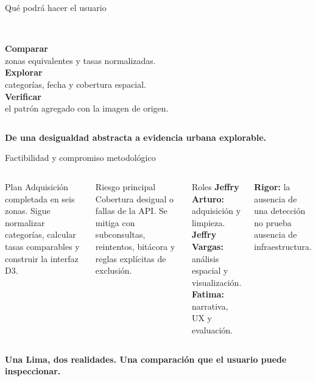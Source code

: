 \documentclass[aspectratio=169,10pt]{beamer}
\begin{document}
\begin{frame}{Qué podrá hacer el usuario}
\begin{columns}[T,onlytextwidth]
\\[4pt]\textbf{Comparar}\\[4pt]\small zonas equivalentes y tasas normalizadas.
\\[4pt]\textbf{Explorar}\\[4pt]\small categorías, fecha y cobertura espacial.
\\[4pt]\textbf{Verificar}\\[4pt]\small el patrón agregado con la imagen de origen.
\end{columns}
\vspace{0.8cm}
\begin{center}
\Large\textbf{De una desigualdad abstracta a evidencia urbana explorable.}
\end{center}
\end{frame}

\begin{frame}{Factibilidad y compromiso metodológico}
\begin{columns}[T,onlytextwidth]
\begin{block}{Plan}
\small Adquisición completada en seis zonas. Sigue normalizar categorías, calcular tasas comparables y construir la interfaz D3.
\end{block}
\begin{block}{Riesgo principal}
\small Cobertura desigual o fallas de la API. Se mitiga con subconsultas, reintentos, bitácora y reglas explícitas de exclusión.
\end{block}
\begin{block}{Roles}
\small \textbf{Jeffry Arturo:} adquisición y limpieza.\\
\textbf{Jeffry Vargas:} análisis espacial y visualización.\\
\textbf{Fatima:} narrativa, UX y evaluación.
\end{block}
\colorbox{sand}{\parbox[c][1.25cm][c]{0.96\linewidth}{\centering\textbf{Rigor:} la ausencia de una detección no prueba ausencia de infraestructura.}}
\end{columns}
\vfill
\centering\color{navy}\large\textbf{Una Lima, dos realidades. Una comparación que el usuario puede inspeccionar.}
\end{frame}
\end{document}
